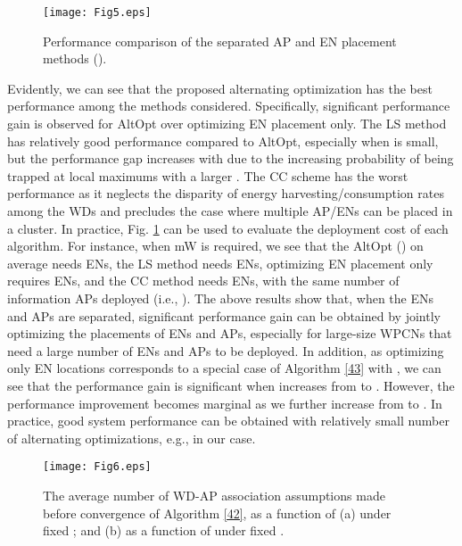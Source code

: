 \documentclass[journal, draftcls, one column, 12pt]{IEEEtran}
\begin{document}
\begin{figure}
\centering
  \begin{center}
    \texttt{[image: Fig5.eps]}
  \end{center}
  \caption{Performance comparison of the separated AP and EN placement methods ().}
  \label{68}
\end{figure}

Evidently, we can see that the proposed alternating optimization has the best performance among the methods considered. Specifically, significant performance gain is observed for AltOpt over optimizing EN placement only. The LS method has relatively good performance compared to AltOpt, especially when  is small, but the performance gap increases with  due to the increasing probability of being trapped at local maximums with a larger . The CC scheme has the worst performance as it neglects the disparity of energy harvesting/consumption rates among the WDs and precludes the case where multiple AP/ENs can be placed in a cluster. In practice, Fig. \ref{68} can be used to evaluate the deployment cost of each algorithm. For instance, when mW is required, we see that the AltOpt () on average needs  ENs, the LS method needs  ENs, optimizing EN placement only requires  ENs, and the CC method needs  ENs, with the same number of information APs deployed (i.e., ). The above results show that, when the ENs and APs are separated, significant performance gain can be obtained by jointly optimizing the placements of ENs and APs, especially for large-size WPCNs that need a large number of ENs and APs to be deployed. In addition, as optimizing only EN locations corresponds to a special case of Algorithm \ref{43} with , we can see that the performance gain is significant when  increases from  to . However, the performance improvement becomes marginal as we further increase  from  to . In practice, good system performance can be obtained with relatively small number of alternating optimizations, e.g.,  in our case.


\begin{figure}
\centering
  \begin{center}
    \texttt{[image: Fig6.eps]}
  \end{center}
  \caption{The average number of WD-AP association assumptions made before convergence of Algorithm \ref{42}, as a function of (a)  under fixed ; and (b) as a function of  under fixed .}
  \label{64}
\end{figure}
\end{document}
